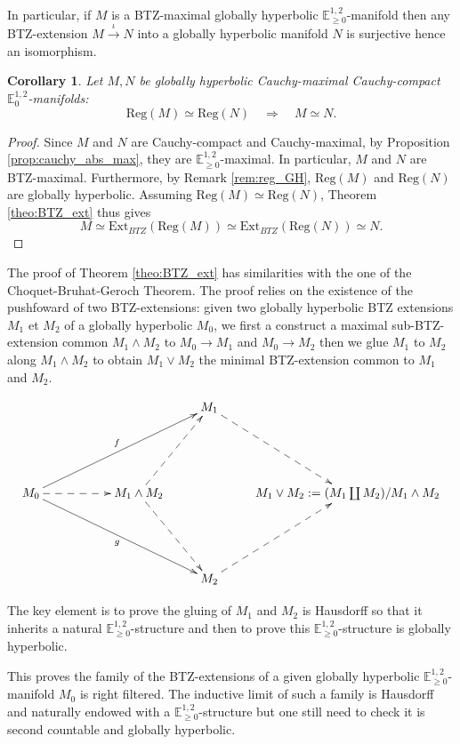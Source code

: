 \documentclass[a4paper,12pt]{article}
\newcommand{\mass}[1]{{\mathbb E}^{1,2}_{#1}}
\def\Reg{\mathrm{Reg}}
\def\BTZext{\mathrm{Ext}_{BTZ}}
\def\reg{\Reg}
\newtheorem{corou}[lemou]{Corollary}
\begin{document}
      In particular, if $M$ is a BTZ-maximal globally hyperbolic $\mass{\geq0}$-manifold then any BTZ-extension $M\xrightarrow{\iota}N$ into a globally hyperbolic manifold $N$ is surjective hence an isomorphism.
   \begin{corou}\label{btzcor:common_reg}\label{cor:common_reg} Let $M,N$ be globally hyperbolic Cauchy-maximal Cauchy-com\-pact $\mass{0}$-manifolds: 
   $$\reg(M)\simeq \reg(N) \quad \Rightarrow{} \quad M\simeq N.$$
   \end{corou}
    \begin{proof}
   Since $M$ and $N$ are Cauchy-compact and Cauchy-maximal, by Proposition \ref{prop:cauchy_abs_max}, they are $\mass{\geq0}$-maximal. In particular, $M$ and $N$ are BTZ-maximal. Furthermore, by Remark \ref{rem:reg_GH}, $\reg(M)$ and $\reg(N)$ are globally hyperbolic. Assuming $\reg(M)\simeq \reg(N)$, Theorem \ref{theo:BTZ_ext} thus gives $$M \simeq \BTZext(\reg(M)) \simeq \BTZext(\reg(N)) \simeq N.$$ 
   \end{proof}
      The proof of Theorem \ref{theo:BTZ_ext} has similarities with the one of the Choquet-Bruhat-Geroch Theorem. The proof relies on the existence of the pushfoward
of two BTZ-extensions: 
given two globally hyperbolic BTZ extensions $M_1$ et $M_2$
		of a globally hyperbolic $M_0$, we first a construct a maximal sub-BTZ-extension common $M_1\wedge M_2$ to  $M_0\rightarrow M_1$ and
		 $M_0\rightarrow M_2$ then we glue $M_1$ to $M_2$ along $M_1\wedge M_2$ to obtain $M_1\vee M_2$ the minimal BTZ-extension common to $M_1$ and $M_2$. 
	
		
		 $$
			\xymatrix{
				&&& M_1\ar@{-->}[ddr] &\\ &&&&\\
			M_0\ar[ddrrr]_g\ar[uurrr]^f\ar@{-->}[rr]&&M_1\wedge M_2\ar@{-->}[uur]\ar@{-->}[ddr]& &M_1\vee M_2:=(M_1\coprod M_2)/M_1\wedge M_2\\ &&&&\\
			&&&M_2\ar@{-->}[uur]&
			}
		$$
	 
		 The key element is to prove the gluing of $M_1$ and $M_2$ is Hausdorff so that it inherits a natural $\mass{\geq0}$-structure and then to prove this  $\mass{\geq0}$-structure is globally hyperbolic. 
		
		This proves the family of the BTZ-extensions of a given globally hyperbolic $\mass{\geq0}$-manifold $M_0$ is right filtered. The inductive limit of such a family is 
		Hausdorff and naturally endowed with a $\mass{\geq0}$-structure but one still need to check it is second countable and globally hyperbolic.
		
\end{document}
